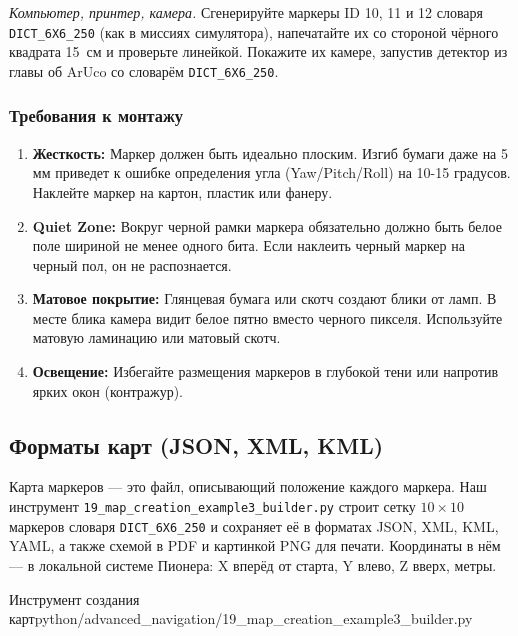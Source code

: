 \begin{taskbox}
\emph{Компьютер, принтер, камера.} Сгенерируйте маркеры ID 10, 11 и 12 словаря \verb|DICT_6X6_250| (как в миссиях симулятора), напечатайте их со стороной чёрного квадрата 15~см и проверьте линейкой. Покажите их камере, запустив детектор из главы об ArUco со словарём \verb|DICT_6X6_250|.
\end{taskbox}

\subsubsection{Требования к монтажу}
\begin{enumerate}
    \item \textbf{Жесткость:} Маркер должен быть идеально плоским. Изгиб бумаги даже на 5 мм приведет к ошибке определения угла (Yaw/Pitch/Roll) на 10-15 градусов. Наклейте маркер на картон, пластик или фанеру.
    \item \textbf{Quiet Zone:} Вокруг черной рамки маркера обязательно должно быть белое поле шириной не менее одного бита. Если наклеить черный маркер на черный пол, он не распознается.
    \item \textbf{Матовое покрытие:} Глянцевая бумага или скотч создают блики от ламп. В месте блика камера видит белое пятно вместо черного пикселя. Используйте матовую ламинацию или матовый скотч.
    \item \textbf{Освещение:} Избегайте размещения маркеров в глубокой тени или напротив ярких окон (контражур).
\end{enumerate}

\subsection{Форматы карт (JSON, XML, KML)}
Карта маркеров — это файл, описывающий положение каждого маркера. Наш инструмент \texttt{19\_map\_creation\_example3\_builder.py} строит сетку $10 \times 10$ маркеров словаря \verb|DICT_6X6_250| и сохраняет её в форматах JSON, XML, KML, YAML, а также схемой в PDF и картинкой PNG для печати. Координаты в нём --- в локальной системе Пионера: X вперёд от старта, Y влево, Z вверх, метры.

\begin{codefiletitle}[python]{Инструмент создания карт}{python/advanced_navigation/19_map_creation_example3_builder.py}
\end{codefiletitle}

